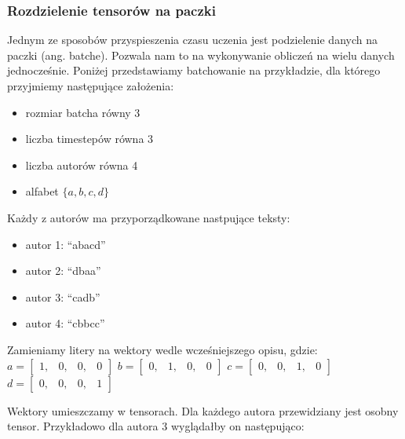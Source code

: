 \subsubsection{Rozdzielenie tensorów na paczki}
Jednym ze sposobów przyspieszenia czasu uczenia jest podzielenie danych na paczki (ang. batche).
Pozwala nam to na wykonywanie obliczeń na wielu danych jednocześnie. Poniżej przedstawiamy batchowanie
na przykładzie, dla którego przyjmiemy następujące założenia: 
\begin{itemize}
	\item rozmiar batcha równy 3
	\item liczba timestepów równa 3
	\item liczba autorów równa 4
	\item alfabet $\{a,b,c,d\}$
\end{itemize}

Każdy z autorów ma przyporządkowane nastpujące teksty:
\begin{itemize}
	\item autor 1: ``abacd''
	\item autor 2: ``dbaa''
	\item autor 3: ``cadb''
	\item autor 4: ``cbbcc''
\end{itemize}

Zamieniamy litery na wektory wedle wcześniejszego opisu, gdzie:
\vspace{3mm}
\newline 
$
a =
\begin{bmatrix} 
1, & 0, & 0, & 0
\end{bmatrix} 
$
\vspace{3mm}
\newline
$
b = 
\begin{bmatrix} 
0, & 1, & 0, & 0
\end{bmatrix} 
$
\vspace{3mm}
\newline 
$
c =
\begin{bmatrix} 
0, & 0, & 1, & 0
\end{bmatrix} 
$
\vspace{3mm}
\newline 
$
d =
\begin{bmatrix} 
0, & 0, & 0, & 1
\end{bmatrix} 
$
\vspace{1mm}
\newline 

Wektory umieszczamy w tensorach. Dla każdego autora przewidziany jest osobny tensor. 
Przykładowo dla autora 3 wyglądałby on następująco:
\vspace{3mm}

